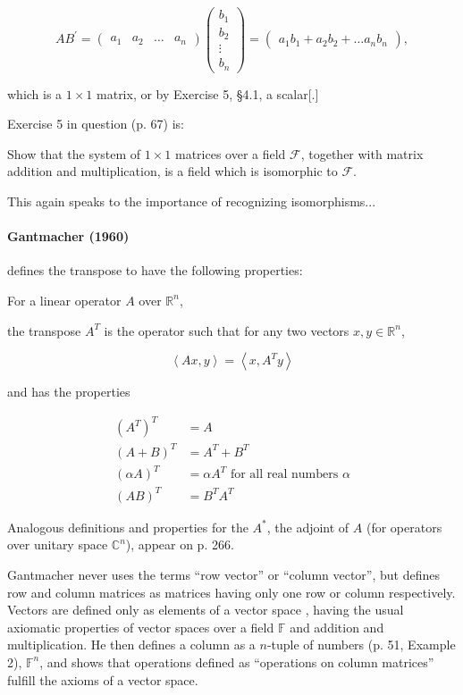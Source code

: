 \[
AB^\prime = \begin{pmatrix} a_1 & a_2 & \ldots & a_n\end{pmatrix}
            \begin{pmatrix} b_1\\ b_2\\ \vdots\\ b_n\end{pmatrix}
          = \begin{pmatrix} a_1b_1 + a_2b_2 + \ldots a_nb_n\end{pmatrix},
\]

which is a $1\times1$ matrix, or by Exercise 5, \S 4.1, a scalar[.]

Exercise 5 in question (p. 67) is:

Show that the system of $1\times1$ matrices over a field $\mathcal F$, together with matrix addition and multiplication, is a field which is isomorphic to $\mathcal F$.

This again speaks to the importance of recognizing isomorphisms...

\paragraph{Gantmacher (1960)~\cite{Gantmacher1960}}

\cite[p. 280, Definition 10]{Gantmacher1960} defines the transpose to have the following properties:

For a linear operator $A$ over $\mathbb R^n$,

the transpose $A^T$ is the operator such that for any two vectors $x, y \in \mathbb R^n$,

\[
\left\langle Ax, y \right\rangle = \left\langle x, A^T y \right\rangle
\]

and has the properties

\begin{align}
{(A^T)}^T & = A \\
{(A + B)}^T & = A^T + B^T \\
{(\alpha A)}^T & = \alpha A^T \textrm{ for all real numbers } \alpha \\
{(A B)}^T & = B^T A^T
\end{align}

Analogous definitions and properties for the $A^*$, the adjoint of $A$ (for operators over unitary space $\mathbb C^n$), appear on p. 266.

Gantmacher never uses the terms ``row vector'' or ``column vector'', but defines row and column matrices as matrices having only one row or column respectively. Vectors are defined only as elements of a vector space \cite[p. 51]{Gantmacher1960}, having the usual axiomatic properties of vector spaces over a field $\mathbb F$ and addition and multiplication. He then defines a column as a $n$-tuple of numbers (p. 51, Example 2), $\mathbb F^n$, and shows that operations defined as ``operations on column matrices'' fulfill the axioms of a vector space.

